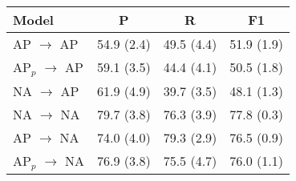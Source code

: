 \begin{tabular}{lccc}
	\toprule
    \textbf{Model} & \textbf{P} & \textbf{R} & \textbf{F1} \\
    \midrule
     AP $\to$ AP & 54.9 (2.4) & 49.5 (4.4) & 51.9 (1.9) \\
     AP$_{p}$ $\to$ AP & 59.1 (3.5) & 44.4 (4.1) & 50.5 (1.8) \\
     NA $\to$ AP & 61.9 (4.9) & 39.7 (3.5) & 48.1 (1.3) \\
    \midrule
     NA $\to$ NA & 79.7 (3.8) & 76.3 (3.9) & 77.8 (0.3) \\
     AP $\to$ NA & 74.0 (4.0) & 79.3 (2.9) & 76.5 (0.9) \\
     AP$_{p}$ $\to$ NA & 76.9 (3.8) & 75.5 (4.7) & 76.0 (1.1) \\
    \bottomrule
\end{tabular}